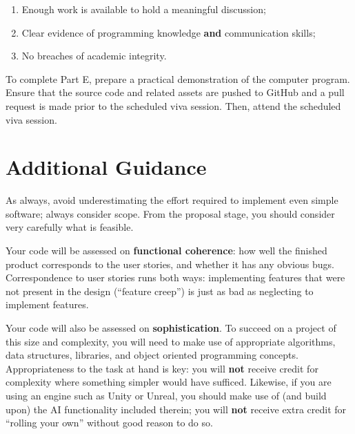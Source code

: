 \documentclass{../../fal_assignment}
\begin{document}
\begin{enumerate}[label=(\alph*)]
	\item Enough work is available to hold a meaningful discussion;
	\item Clear evidence of programming knowledge \textbf{and} communication skills;
	\item No breaches of academic integrity.
\end{enumerate}

To complete Part E, prepare a practical demonstration of the computer program. Ensure that the source code and related assets are pushed to GitHub and a pull request is made prior to the scheduled viva session. Then, attend the scheduled viva session.

\section*{Additional Guidance}

As always, avoid underestimating the effort required to implement even simple software; always consider scope.
From the proposal stage, you should consider very carefully what is feasible.

Your code will be assessed on \textbf{functional coherence}:
how well the finished product corresponds to the user stories,
and whether it has any obvious bugs.
Correspondence to user stories runs both ways:
implementing features that were not present in the design (``feature creep'')
is just as bad as neglecting to implement features.


Your code will also be assessed on \textbf{sophistication}.
To succeed on a project of this size and complexity,
you will need to make use of appropriate algorithms, data structures, libraries, and object oriented programming concepts.
Appropriateness to the task at hand is key:
you will \textbf{not} receive credit for complexity  
where something simpler would have sufficed.
Likewise, if you are using an engine such as Unity or Unreal,
you should make use of (and build upon) the AI functionality included therein;
you will \textbf{not} receive extra credit for ``rolling your own'' without good reason to do so.
\end{document}

